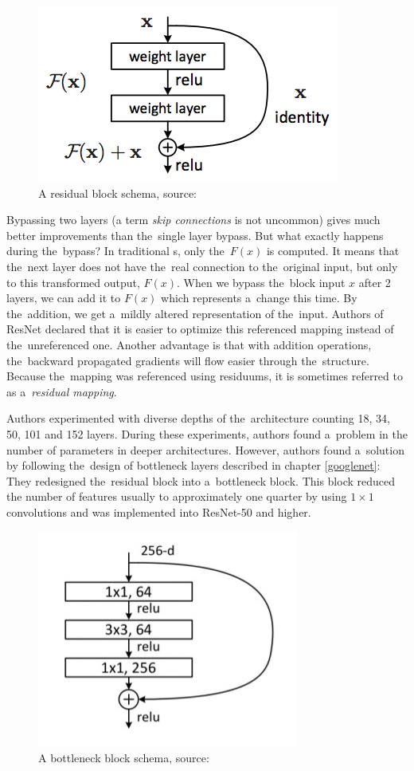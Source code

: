 \begin{figure}[H]
   \centering
	\includegraphics[width=0.4\linewidth]{./pictures/residual-block.png}
	\caption[Residual block]{A residual block schema, source: \cite{resnet}}
      \label{fig:res-block}
\end{figure}

Bypassing two layers (a term \textit{skip connections} is not uncommon) gives 
much better improvements than the~single layer bypass. But what exactly happens
during the~bypass? In traditional s, only the~$F(x)$ is computed. It 
means that the~next layer does not have the~real connection to the~original 
input, but only to this transformed output, $F(x)$. When we bypass the~block 
input $x$ after 2 layers, we can add it to $F(x)$ which represents a~change
this time. By the~addition, we get a~mildly altered representation of
the~input. Authors of ResNet declared that it is easier to optimize this
referenced mapping instead of the~unreferenced one. Another advantage is that
with addition operations, the~backward propagated gradients will flow easier
through the~structure. Because the~mapping was referenced using residuums, it
is sometimes referred to as a~\textit{residual mapping}.

Authors experimented with diverse depths of the~architecture counting 18, 34, 
50, 101 and 152 layers. During these experiments, authors found a~problem in
the number of parameters in deeper architectures. However, authors found
a~solution by following the~design of bottleneck layers described in chapter
\ref{googlenet}: They redesigned the~residual block into a~bottleneck block.
This block reduced the number of features usually to approximately one quarter
by using $1 \times 1$ convolutions and was implemented into ResNet-50 and
higher.

\begin{figure}[H]
   \centering
	\includegraphics[width=0.4\linewidth]{./pictures/bottleneck-block.jpg}
	\caption[Bottleneck block]{A bottleneck block schema, source: \cite{resnet}}
      \label{fig:bottleneck-block}
\end{figure}

